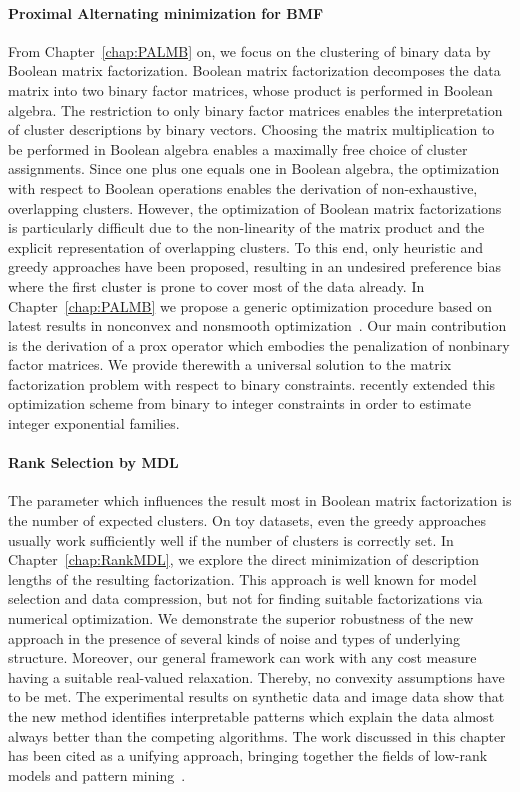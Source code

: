 \paragraph{Proximal Alternating minimization for BMF} From Chapter~\ref{chap:PALMB} on, we focus on the clustering of binary data by Boolean matrix factorization. Boolean matrix factorization decomposes the data matrix into two binary factor matrices, whose product is performed in Boolean algebra. The restriction to only binary factor matrices enables the interpretation of cluster descriptions by binary vectors. Choosing the matrix multiplication to be performed in Boolean algebra enables a maximally free choice of cluster assignments. Since one plus one equals one in Boolean algebra, the optimization with respect to Boolean operations enables the derivation of non-exhaustive, overlapping clusters. However, the optimization of Boolean matrix factorizations is particularly difficult due to the non-linearity of the matrix product and the explicit representation of overlapping clusters. To this end, only heuristic and greedy approaches have been proposed, resulting in an undesired preference bias where the first cluster is prone to cover most of the data already. In Chapter~\ref{chap:PALMB} we propose a generic optimization procedure based on latest results in nonconvex and nonsmooth optimization~\citep{hess2017primping}. Our main contribution is the derivation of a prox operator which embodies the penalization of nonbinary factor matrices. We provide therewith a universal solution to the matrix factorization problem with respect to binary constraints. \cite{piatkowski2018exponential} recently  extended this optimization scheme from binary to integer constraints in order to estimate integer exponential families. 
\paragraph{Rank Selection by MDL} 
The parameter which influences the result most in Boolean matrix factorization is the number of expected clusters. On toy datasets, even the greedy approaches usually work sufficiently well if the number of clusters is correctly set. In Chapter~\ref{chap:RankMDL}, we explore the direct minimization of description lengths of the resulting factorization. This approach is well known for model selection and data compression, but not for finding suitable factorizations via numerical optimization. 
We demonstrate the superior robustness of the new approach in the presence of several kinds of noise and types of underlying structure. 
Moreover, our general framework can work with any cost measure having a suitable real-valued relaxation. Thereby, no convexity assumptions have to be met. 
The experimental results on synthetic data and image data show that the new method identifies interpretable patterns 
which explain the data almost always better than the competing algorithms. The work discussed in this chapter has been cited as a unifying approach, bringing together the fields of low-rank models and pattern mining~\citep{pfahler2017learning,ramirez2018binary,holzinger2017towards}. 
